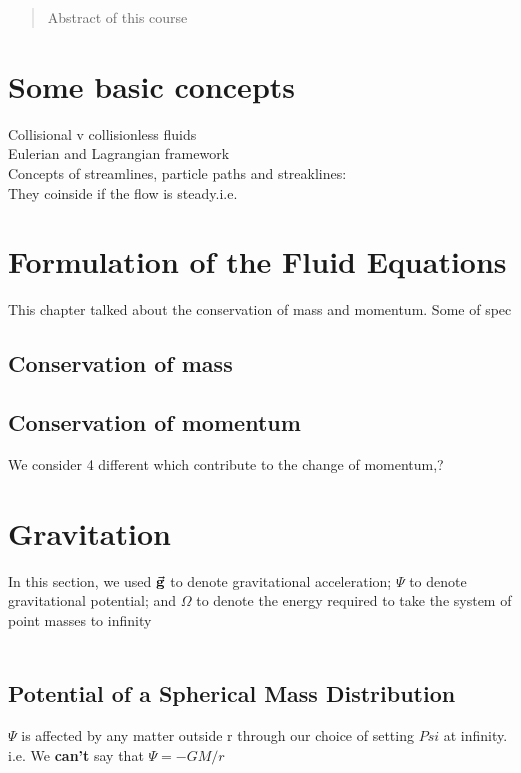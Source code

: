 \documentclass[12pt,a4paper]{article}
\begin{document}
\begin{titlepage}
    \maketitle
\end{titlepage}

\tableofcontents

\newpage

\begin{abstract}
\noindent
Abstract of this course
\end{abstract}
\section{Some basic concepts}
Collisional v collisionless fluids\\
Eulerian and Lagrangian framework\\
Concepts of streamlines, particle paths and streaklines:\\
They coinside if the flow is steady.i.e. \\
\section{Formulation of the Fluid Equations}
This chapter talked about the conservation of mass and momentum. Some of spec
\subsection{Conservation of mass}
\subsection{Conservation of momentum}
We consider 4 different which contribute to the change of momentum,?
\section{Gravitation}
In this section, 
we used $\va{g}$ to denote gravitational acceleration; 
$\Psi$ to denote gravitational potential;
and $\Omega$ to denote the energy required to take the system of point masses to infinity\\
\\
\subsection{Potential of a Spherical Mass Distribution}
$\Psi$ is affected by any matter outside r through our choice of setting $Psi$ at infinity. 
i.e. We \textbf{can't} say that $\Psi = -GM/r$
\end{document}
